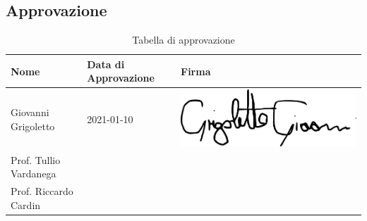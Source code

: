 \subsection{Approvazione}
{
	\renewcommand{\arraystretch}{2}
	\centering
	\begin{longtable}{ C{5cm} C{4cm} C{5cm} }
		\caption{Tabella di approvazione}\\
		\rowcolor{\primaryColor}
        \textcolor{\secondaryColor}{\textbf{Nome}} & \textcolor{\secondaryColor}{\textbf{Data di Approvazione}} & \textcolor{\secondaryColor}{\textbf{Firma}}\\	\endhead
		{Giovanni Grigoletto} & 2021-01-10 & \includegraphics[scale=0.20]{./src/Organigramma/immagini/firme/giovanni.png}\\
		{Prof. Tullio Vardanega} &  &   \\
		{Prof. Riccardo Cardin} &  &   \\
	\end{longtable}
}

